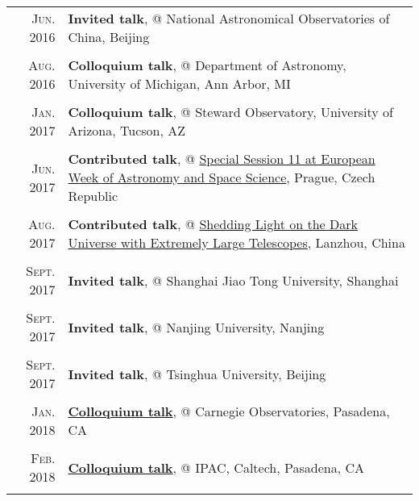 \documentclass[letterpaper,10pt]{article}
\begin{document}
\begin{longtable}{r|p{5.5in}}
    \textsc{Jun. 2016}   &   \textbf{Invited talk}, @ National Astronomical Observatories of China, Beijing   \\
    \multicolumn{2}{c}{} \\

    \textsc{Aug. 2016}   &   \textbf{Colloquium talk}, @ Department of Astronomy, University of Michigan, Ann Arbor, MI \\
    \multicolumn{2}{c}{} \\

    \textsc{Jan. 2017}   &   \textbf{Colloquium talk}, @ Steward Observatory, University of Arizona, Tucson, AZ \\
    \multicolumn{2}{c}{} \\

    \textsc{Jun. 2017}   &   \textbf{Contributed talk}, @ 
    \href{http://eas.unige.ch/EWASS2017/session.jsp?id=SS11}{Special Session 11 at 
    European Week of Astronomy and Space Science}, Prague, Czech Republic   \\
    \multicolumn{2}{c}{} \\

    \textsc{Aug. 2017}   &   \textbf{Contributed talk}, @
    \href{http://darkuniverse2017.csp.escience.cn/dct/page/65580}{Shedding Light on 
    the Dark Universe with Extremely Large Telescopes}, Lanzhou, China      \\
    \multicolumn{2}{c}{} \\

    \textsc{Sept. 2017}   &   \textbf{Invited talk}, @ Shanghai Jiao Tong University, Shanghai \\
    \multicolumn{2}{c}{} \\

    \textsc{Sept. 2017}   &   \textbf{Invited talk}, @ Nanjing University, Nanjing \\
    \multicolumn{2}{c}{} \\

    \textsc{Sept. 2017}   &   \textbf{Invited talk}, @ Tsinghua University, Beijing \\
    \multicolumn{2}{c}{} \\

    \textsc{Jan. 2018}   &   \href{http://obs.carnegiescience.edu/talk_event/828}{\textbf{Colloquium talk}}, @ Carnegie Observatories, Pasadena, CA \\
    \multicolumn{2}{c}{} \\

    \textsc{Feb. 2018}   &   \href{https://www.ipac.caltech.edu/event/358}{\textbf{Colloquium talk}}, @ IPAC, Caltech, Pasadena, CA \\
    \multicolumn{2}{c}{}

\end{longtable}
\end{document}
